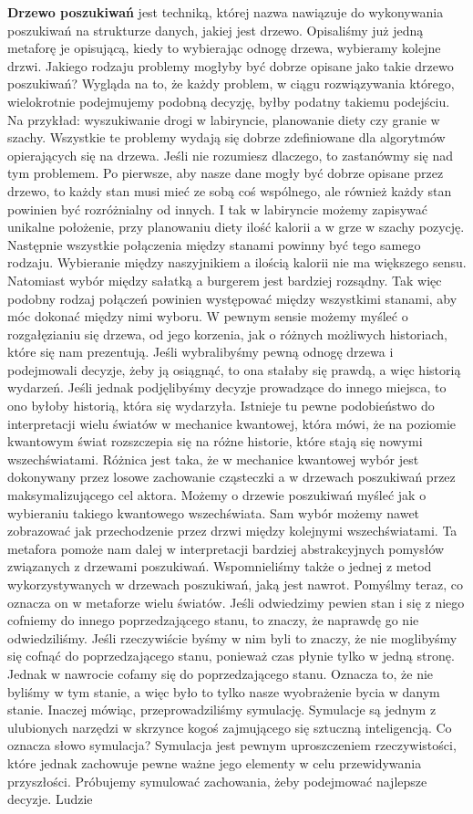 \textbf{Drzewo poszukiwań} jest techniką, której nazwa nawiązuje do wykonywania poszukiwań na strukturze danych, jakiej jest drzewo. Opisaliśmy już jedną metaforę je opisującą, kiedy to wybierając odnogę drzewa, wybieramy kolejne drzwi. Jakiego rodzaju problemy mogłyby być dobrze opisane jako takie drzewo poszukiwań? Wygląda na to, że każdy problem, w ciągu rozwiązywania którego, wielokrotnie podejmujemy podobną decyzję, byłby podatny takiemu podejściu. Na przykład: wyszukiwanie drogi w labiryncie, planowanie diety czy granie w szachy. Wszystkie te problemy wydają się dobrze zdefiniowane dla algorytmów opierających się na drzewa. Jeśli nie rozumiesz dlaczego, to zastanówmy się nad tym problemem. Po pierwsze, aby nasze dane mogły być dobrze opisane przez drzewo, to każdy stan musi mieć ze sobą coś wspólnego, ale również każdy stan powinien być rozróżnialny od innych. I tak w labiryncie możemy zapisywać unikalne położenie, przy planowaniu diety ilość kalorii a w grze w szachy pozycję. Następnie wszystkie połączenia między stanami powinny być tego samego rodzaju. Wybieranie między naszyjnikiem a ilością kalorii nie ma większego sensu. Natomiast wybór między sałatką a burgerem jest bardziej rozsądny. Tak więc podobny rodzaj połączeń powinien występować między wszystkimi stanami, aby móc dokonać między nimi wyboru. W pewnym sensie możemy myśleć o rozgałęzianiu się drzewa, od jego korzenia, jak o różnych możliwych historiach, które się nam prezentują. Jeśli wybralibyśmy pewną odnogę drzewa i podejmowali decyzje, żeby ją osiągnąć, to ona stałaby się prawdą, a więc historią wydarzeń. Jeśli jednak podjęlibyśmy decyzje prowadzące do innego miejsca, to ono byłoby historią, która się wydarzyła. Istnieje tu pewne podobieństwo do interpretacji wielu światów w mechanice kwantowej, która mówi, że na poziomie kwantowym świat rozszczepia się na różne historie, które stają się nowymi wszechświatami. Różnica jest taka, że w mechanice kwantowej wybór jest dokonywany przez losowe zachowanie cząsteczki a w drzewach poszukiwań przez maksymalizującego cel aktora. Możemy o drzewie poszukiwań myśleć jak o wybieraniu takiego kwantowego wszechświata. Sam wybór możemy nawet zobrazować jak przechodzenie przez drzwi między kolejnymi wszechświatami. Ta metafora pomoże nam dalej w interpretacji bardziej abstrakcyjnych pomysłów związanych z drzewami poszukiwań. Wspomnieliśmy także o jednej z metod wykorzystywanych w drzewach poszukiwań, jaką jest nawrot. Pomyślmy teraz, co oznacza on w metaforze wielu światów. Jeśli odwiedzimy pewien stan i się z niego cofniemy do innego poprzedzającego stanu, to znaczy, że naprawdę go nie odwiedziliśmy. Jeśli rzeczywiście byśmy w nim byli to znaczy, że nie moglibyśmy się cofnąć do poprzedzającego stanu, ponieważ czas płynie tylko w jedną stronę. Jednak w nawrocie cofamy się do poprzedzającego stanu. Oznacza to, że nie byliśmy w tym stanie, a więc było to tylko nasze wyobrażenie bycia w danym stanie. Inaczej mówiąc, przeprowadziliśmy symulację. Symulacje są jednym z ulubionych narzędzi w skrzynce kogoś zajmującego się sztuczną inteligencją. Co oznacza słowo symulacja? Symulacja jest pewnym uproszczeniem rzeczywistości, które jednak zachowuje pewne ważne jego elementy w celu przewidywania przyszłości. Próbujemy symulować zachowania, żeby podejmować najlepsze decyzje. Ludzie 